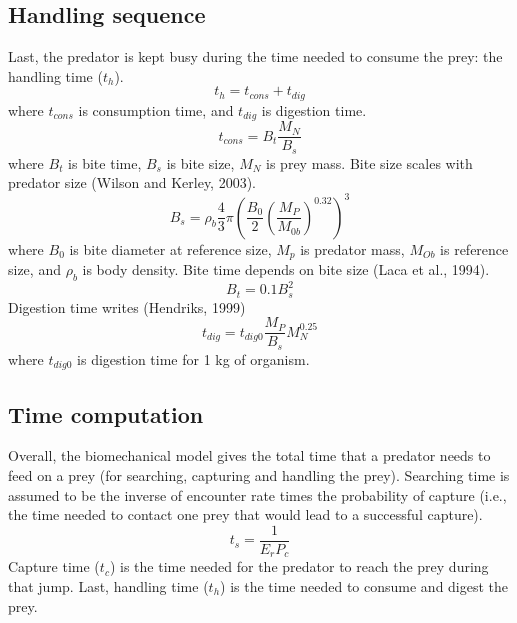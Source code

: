 \documentclass[utf8, 12 pt]{frontiers_suppmat}
\begin{document}
\subsection{Handling sequence}
Last, the predator is kept busy during the time needed to consume the prey: the handling time ($t_h$).
\begin{equation}
	t_h=t_{cons}+t_{dig}
\end{equation}
where $t_{cons}$ is consumption time, and $t_{dig}$ is digestion time. 
\begin{equation}
	t_{cons}=B_t \frac{ M_N}{B_s} 
\end{equation}
where $B_t$ is bite time, $B_s$ is bite size, $M_N$ is prey mass. Bite size scales with predator size (Wilson and Kerley, 2003).
\begin{equation}
	B_s=\rho _b  \frac{4}{3} \pi \left( \frac{B_0}{2} \left( \frac{M_P}{M_{0b}} \right)^{0.32} \right)^3	
\end{equation}
where $B_0$ is bite diameter at reference size, $M_p$ is predator mass, $M_{Ob}$ is reference size, and $\rho _b$ is body density. Bite time depends on bite size (Laca et al., 1994)⁠. 
\begin{equation}
	B_t=0.1 B_s^2
\end{equation}
Digestion time writes (Hendriks, 1999)
\begin{equation}
	t_{dig}=t_{dig0}  \frac{M_P}{B_s}  M_N^{0.25}
\end{equation}
where $t_{dig0}$ is digestion time for 1 kg of organism. \par

\subsection{Time computation}
Overall, the biomechanical model gives the total time that a predator needs to feed on a prey (for searching, capturing and handling the prey). Searching time is assumed to be the inverse of encounter rate times the probability of capture (i.e., the time needed to contact one prey that would lead to a successful capture).
\begin{equation}\label{search}
	t_s= \frac{1}{E_r P_c}
\end{equation}
Capture time ($t_c$) is the time needed for the predator to reach the prey during that jump. Last, handling time ($t_h$) is the time needed to consume and digest the prey. \par
\end{document}
